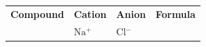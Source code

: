 \begin{enumerate}[noitemsep, label=\textbf{\arabic*}. ]
{{\begin{center}
\begin{tabular}[t]{|l|l|l|l|}
        \textbf{Compound} &
    
    
        \textbf{Cation} &
    
    
        \textbf{Anion} &
    
    
        \textbf{Formula}%
     \tabularnewline\cline{1-1}\cline{2-2}\cline{3-3}\cline{4-4}
    
    
         &
    
    
        \begin{math}\mathrm{Na}{}^{+}\end{math} &
    
    
        \begin{math}\mathrm{Cl}{}^{-}\end{math} &
    
    
     \tabularnewline\cline{1-1}\cline{2-2}\cline{3-3}\cline{4-4}
    

\end{tabular}
\end{center}}}
\end{enumerate}
